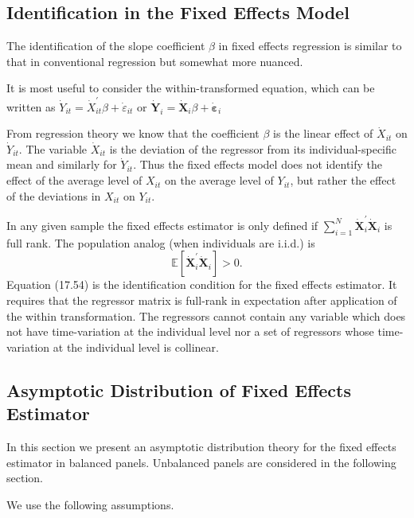\documentclass[10pt]{article}
\begin{document}
\subsection{Identification in the Fixed Effects Model}
The identification of the slope coefficient $\beta$ in fixed effects regression is similar to that in conventional regression but somewhat more nuanced.

It is most useful to consider the within-transformed equation, which can be written as $\dot{Y}_{i t}=\dot{X}_{i t}^{\prime} \beta+\dot{\varepsilon}_{i t}$ or $\dot{\boldsymbol{Y}}_{i}=\dot{\boldsymbol{X}}_{i} \beta+\dot{\boldsymbol{\varepsilon}}_{i}$

From regression theory we know that the coefficient $\beta$ is the linear effect of $\dot{X}_{i t}$ on $\dot{Y}_{i t}$. The variable $\dot{X}_{i t}$ is the deviation of the regressor from its individual-specific mean and similarly for $\dot{Y}_{i t}$. Thus the fixed effects model does not identify the effect of the average level of $X_{i t}$ on the average level of $Y_{i t}$, but rather the effect of the deviations in $X_{i t}$ on $Y_{i t}$.

In any given sample the fixed effects estimator is only defined if $\sum_{i=1}^{N} \dot{\boldsymbol{X}}_{i}^{\prime} \dot{\boldsymbol{X}}_{i}$ is full rank. The population analog (when individuals are i.i.d.) is
$$
\mathbb{E}\left[\dot{\boldsymbol{X}}_{i}^{\prime} \dot{\boldsymbol{X}}_{i}\right]>0 .
$$
Equation (17.54) is the identification condition for the fixed effects estimator. It requires that the regressor matrix is full-rank in expectation after application of the within transformation. The regressors cannot contain any variable which does not have time-variation at the individual level nor a set of regressors whose time-variation at the individual level is collinear.

\subsection{Asymptotic Distribution of Fixed Effects Estimator}
In this section we present an asymptotic distribution theory for the fixed effects estimator in balanced panels. Unbalanced panels are considered in the following section.

We use the following assumptions.
\end{document}
